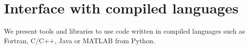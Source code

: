\section{Interface with compiled languages}
\label{sec:interface}

We present tools and libraries to use code written in compiled languages such as Fortran, C/C++, Java or MATLAB from Python.
